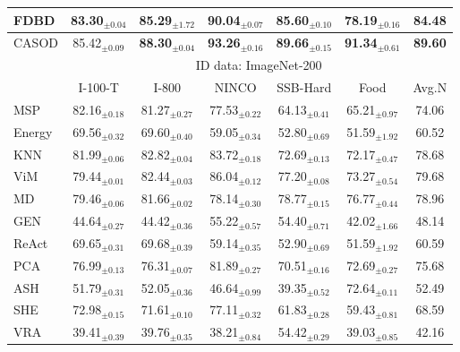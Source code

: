 \begin{table}[t!]
{\begin{tabular}{|l|ccccc|c|}
FDBD\cite{liu2024fast}   & 83.30$_{\pm 0.04}$ & 85.29$_{\pm 1.72}$ & 90.04$_{\pm 0.07}$ & 85.60$_{\pm 0.10}$ & 78.19$_{\pm 0.16}$ & 84.48\\ \hline
CASOD  & 85.42$_{\pm 0.09}$ & \textbf{88.30}$_{\pm 0.04}$ & \textbf{93.26}$_{\pm 0.16}$ & \textbf{89.66}$_{\pm 0.15}$ & \textbf{91.34}$_{\pm 0.61}$ & \textbf{89.60} \\ \hline
			\multirow{2}{*}{} &  \multicolumn{6}{c|}{ID data: ImageNet-200}  \\ \cline{2-7}
			& I-100-T & I-800  & NINCO & SSB-Hard & Food & Avg.N\\ \hline
            MSP\cite{hendrycks2017baseline}    & 82.16$_{\pm 0.18}$ & 81.27$_{\pm 0.27}$ & 77.53$_{\pm 0.22}$ & 64.13$_{\pm 0.41}$ & 65.21$_{\pm 0.97}$ & 74.06  \\
Energy\cite{liu2020energy} & 69.56$_{\pm 0.32}$ & 69.60$_{\pm 0.40}$ & 59.05$_{\pm 0.34}$ & 52.80$_{\pm 0.69}$ & 51.59$_{\pm 1.92}$ & 60.52 \\
KNN\cite{sun2022out}    & 81.99$_{\pm 0.06}$ & 82.82$_{\pm 0.04}$ & 83.72$_{\pm 0.18}$ & 72.69$_{\pm 0.13}$ & 72.17$_{\pm 0.47}$ & 78.68\\
ViM\cite{wang2022vim}    & 79.44$_{\pm 0.01}$ & 82.44$_{\pm 0.03}$ & 86.04$_{\pm 0.12}$ & 77.20$_{\pm 0.08}$ & 73.27$_{\pm 0.54}$ & 79.68 \\
MD\cite{lee2018simple}     & 79.46$_{\pm 0.06}$ & 81.66$_{\pm 0.02}$ & 78.14$_{\pm 0.30}$ & 78.77$_{\pm 0.15}$ & 76.77$_{\pm 0.44}$ & 78.96\\
GEN\cite{liu2023gen}    & 44.64$_{\pm 0.27}$ & 44.42$_{\pm 0.36}$ & 55.22$_{\pm 0.57}$ & 54.40$_{\pm 0.71}$ & 42.02$_{\pm 1.66}$ & 48.14\\
ReAct\cite{sun2021react}  & 69.65$_{\pm 0.31}$ & 69.68$_{\pm 0.39}$ & 59.14$_{\pm 0.35}$ & 52.90$_{\pm 0.69}$ & 51.59$_{\pm 1.92}$ & 60.59 \\
PCA\cite{guan2023revisit}    & 76.99$_{\pm 0.13}$ & 76.31$_{\pm 0.07}$ & 81.89$_{\pm 0.27}$ & 70.51$_{\pm 0.16}$ & 72.69$_{\pm 0.27}$ & 75.68  \\
ASH\cite{djurisic2022extremely}    & 51.79$_{\pm 0.31}$ & 52.05$_{\pm 0.36}$ & 46.64$_{\pm 0.99}$ & 39.35$_{\pm 0.52}$ & 72.64$_{\pm 0.11}$ & 52.49 \\
SHE\cite{zhang2022out}    & 72.98$_{\pm 0.15}$ & 71.61$_{\pm 0.10}$ & 77.11$_{\pm 0.32}$ & 61.83$_{\pm 0.28}$ & 59.43$_{\pm 0.81}$ & 68.59\\
VRA\cite{xu2024vra}    & 39.41$_{\pm 0.39}$ & 39.76$_{\pm 0.35}$ & 38.21$_{\pm 0.84}$ & 54.42$_{\pm 0.29}$ & 39.03$_{\pm 0.85}$ & 42.16\\

\end{tabular}}
\end{table}
